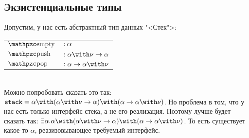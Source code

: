 \subsection{\texorpdfstring{Экзистенциальные типы}{Existential types}}

\todo
Допустим, у нас есть абстрактный тип данных "<Стек">: \\
\begin{tabular}{l l}
    $\comb{empty}$ & $: \alpha$ \\
    $\comb{push}$  & $: \alpha\with\nu\rightarrow\alpha$ \\
    $\comb{pop}$   & $: \alpha\rightarrow\alpha\with\nu$ \\
\end{tabular} \\
Можно попробовать сказать это так: $\mathtt{stack} =
    \alpha \with (\alpha\with\nu\rightarrow\alpha) \with (\alpha\rightarrow\alpha\with\nu)$.
Но проблема в том, что у нас есть только интерфейс стека, а не его реализация. Поэтому лучше будет сказать так:
    $\exists \alpha . \alpha \with (\alpha\with\nu\rightarrow\alpha) \with (\alpha\rightarrow\alpha\with\nu)$.
То есть существует какое-то $\alpha$, реазизовывающее требуемый интерфейс.
\todo 

\ 


